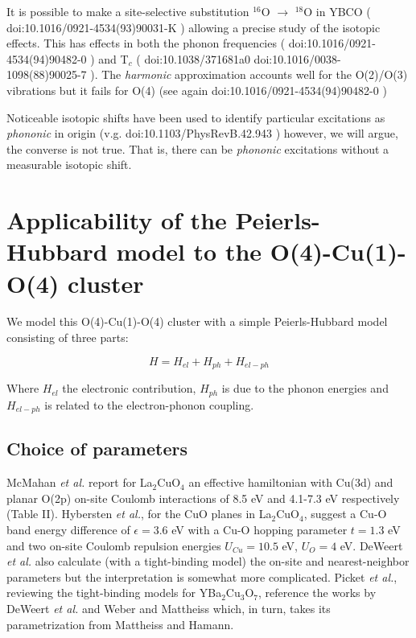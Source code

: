 It is possible to make a site-selective substitution $^{16}$O $\rightarrow$ $^{18}$O in YBCO ( doi:10.1016/0921-4534(93)90031-K ) allowing a precise study of the isotopic effects. This has effects in both the phonon frequencies ( doi:10.1016/0921-4534(94)90482-0 ) and T$_{c}$ ( doi:10.1038/371681a0 doi:10.1016/0038-1098(88)90025-7 ). The \textit{harmonic} approximation accounts well for the O(2)/O(3) vibrations but it fails for O(4) (see again doi:10.1016/0921-4534(94)90482-0 )

Noticeable isotopic shifts have been used to identify particular excitations as \textit{phononic} in origin (v.g.  doi:10.1103/PhysRevB.42.943 ) however, we will argue, the converse is not true. That is, there can be \textit{phononic} excitations without a measurable isotopic shift.

\section{Applicability of the Peierls-Hubbard model to the O(4)-Cu(1)-O(4) cluster}

We model this O(4)-Cu(1)-O(4) cluster with a simple Peierls-Hubbard model consisting of three parts:

\begin{equation}\label{eq:full-hamiltonian}H = H_{el} + H_{ph} + H_{el-ph}\end{equation}

Where $H_{el}$ the electronic contribution, $H_{ph}$ is due to the phonon energies and $H_{el-ph}$ is related to the electron-phonon coupling.

\subsection{Choice of parameters}

McMahan \textit{et al.}\cite{McMahan1988} report for La$_{2}$CuO$_{4}$ an effective hamiltonian with Cu(3d) and planar O(2p) on-site Coulomb interactions of 8.5 eV and 4.1-7.3 eV respectively (Table II). Hybersten \textit{et al.}\cite{Hybertsen1989}, for the CuO planes in La$_{2}$CuO$_{4}$, suggest a Cu-O band energy difference of $\epsilon = 3.6$ eV with a Cu-O hopping parameter $t = 1.3$ eV and two on-site Coulomb repulsion energies $U_{Cu} = 10.5$ eV, $U_O = 4$ eV. DeWeert \textit{et al.}\cite{DeWeert1989} also calculate (with a tight-binding model) the on-site and nearest-neighbor parameters but the interpretation is somewhat more complicated. Picket \textit{et al.}\cite{Pickett1989}, reviewing the tight-binding models for YBa$_{2}$Cu$_{3}$O$_{7}$, reference the works by DeWeert \textit{et al.}\cite{DeWeert1989} and Weber and Mattheiss\cite{Weber1988} which, in turn, takes its parametrization from Mattheiss and Hamann\cite{Mattheiss1987}.

